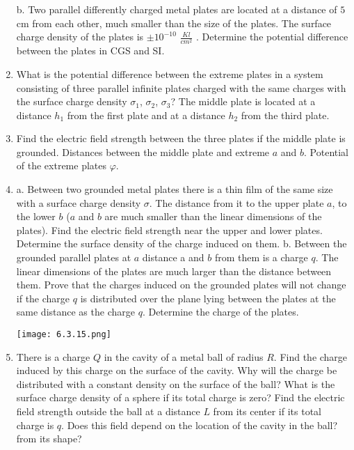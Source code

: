 \documentclass{article}
\begin{document}
\begin{enumerate}[label=6.3.\arabic*]
b. Two parallel differently charged metal plates are located at a distance of $5$ cm from each other, much smaller than the size of the plates. The surface charge density of the plates is $\pm 10^{-10}$ $\frac{Kl}{cm^2}$ . Determine the potential difference between the plates in CGS and SI.

\item What is the potential difference between the extreme plates in a system consisting of three parallel infinite plates charged with the same charges with the surface charge density $\sigma_1$, $\sigma_2$, $\sigma_3$? The middle plate is located at a distance $h_1$ from the first plate and at a distance $h_2$ from the third plate.

\item Find the electric field strength between the three plates if the middle plate is grounded. Distances between the middle plate and extreme $a$ and $b$. Potential of the extreme plates $\varphi$.

\item a. Between two grounded metal plates there is a thin film of the same size with a surface charge density $\sigma$. The distance from it to the upper plate $a$, to the lower $b$ ($a$ and $b$ are much smaller than the linear dimensions of the plates). Find the electric field strength near the upper and lower plates. Determine the surface density of the charge induced on them.
b. Between the grounded parallel plates at $a$ distance a and $b$ from them is a charge $q$. The linear dimensions of the plates are much larger than the distance between them. Prove that the charges induced on the grounded plates will not change if the charge $q$ is distributed over the plane lying between the plates at the same distance as the charge $q$. Determine the charge of the plates.

\begin{center}
    \texttt{[image: 6.3.15.png]}
\end{center}


\item There is a charge $Q$ in the cavity of a metal ball of radius $R$. Find the charge induced by this charge on the surface of the cavity. Why will the charge be distributed with a constant density on the surface of the ball? What is the surface charge density of a sphere if its total charge is zero? Find the electric field strength outside the ball at a distance $L$ from its center if its total charge is $q$. Does this field depend on the location of the cavity in the ball? from its shape?


\end{enumerate}
\end{document}
